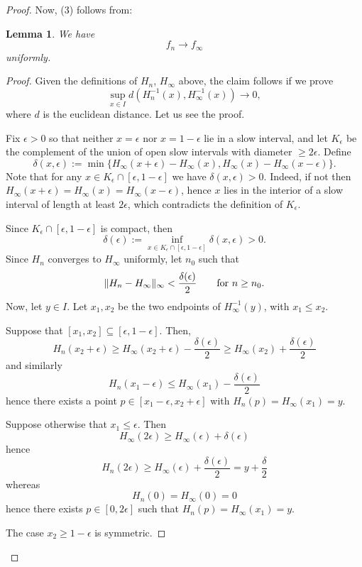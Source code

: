 \documentclass[11pt]{amsart}
\newtheorem{lemma}[theorem]{Lemma}
\begin{document}
\begin{proof}
Now, (3) follows from: 

\begin{lemma} \label{L:f-convergence}
We have 
$$f_n \to f_\infty$$
uniformly. 
\end{lemma}

\begin{proof}
Given the definitions of $H_n$, $H_\infty$ above, the claim follows if we prove 
$$\sup_{x \in I} d(H_n^{-1}(x), H_\infty^{-1}(x)) \to 0,$$
where $d$ is the euclidean distance. Let us see the proof. 

Fix $\epsilon > 0$ so that neither $x = \epsilon$ nor $x = 1 - \epsilon$ lie in a slow interval, and let $K_\epsilon$ be the complement of the union of open slow intervals with diameter $\geq 2 \epsilon$. 
Define 
$$\delta(x, \epsilon) :=  \min \{ H_\infty(x + \epsilon) - H_\infty(x), H_\infty(x) - H_\infty(x -\epsilon)\}.$$
Note that for any $x \in K_\epsilon \cap [\epsilon, 1 - \epsilon]$ we have $\delta(x, \epsilon) > 0$. 
Indeed, if not then $H_\infty(x + \epsilon) = H_\infty(x) = H_\infty(x-\epsilon)$, hence $x$ lies 
in the interior of a slow interval of length at least $2 \epsilon$, which contradicts the definition of 
$K_\epsilon$. 

Since $K_\epsilon \cap [\epsilon, 1 - \epsilon]$ is compact, then 
$$\delta(\epsilon) := \inf_{x \in K_\epsilon \cap [\epsilon, 1 - \epsilon]} \delta(x, \epsilon)  > 0.$$
Since $H_n$ converges to $H_\infty$ uniformly,  let $n_0$ such that 
$$\Vert H_n - H_\infty \Vert_\infty < \frac{\delta(\epsilon)}{2} \qquad \textup{for }n \geq n_0.$$ 
Now, let $y \in I$. Let $x_1, x_2$ be the two endpoints of $H_\infty^{-1}(y)$, with $x_1 \leq x_2$. 

Suppose that $[x_1, x_2] \subseteq [\epsilon, 1 - \epsilon]$. 
Then, 
$$H_n(x_2 + \epsilon) \geq H_\infty(x_2+ \epsilon) - \frac{\delta(\epsilon)}{2} 
\geq H_\infty(x_2) + \frac{\delta(\epsilon)}{2}$$
and similarly 
$$H_n(x_1 - \epsilon) \leq H_\infty(x_1) - \frac{\delta(\epsilon)}{2}$$
hence there exists a point $p \in [x_1 - \epsilon, x_2 + \epsilon]$ with $H_n(p) = H_\infty(x_1) = y$.

Suppose otherwise that $x_1 \leq \epsilon$. Then 
$$H_\infty(2 \epsilon) \geq H_\infty(\epsilon) + \delta(\epsilon)$$
hence 
$$H_n(2 \epsilon) \geq H_\infty(\epsilon) + \frac{\delta(\epsilon)}{2} = y + \frac{\delta}{2}$$
whereas 
$$H_n(0) = H_\infty(0) = 0$$
hence there exists $p \in [0, 2 \epsilon]$ such that $H_n(p) = H_\infty(x_1) = y$.

The case $x_2 \geq 1 - \epsilon$ is symmetric.
\end{proof}


\end{proof}
\end{document}
